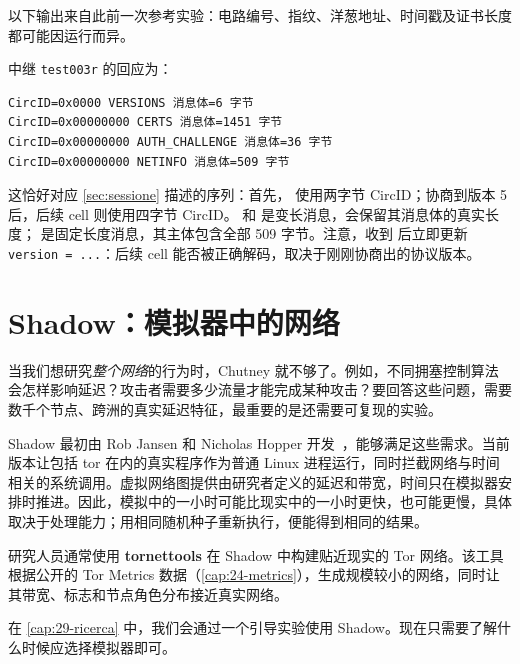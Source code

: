 以下输出来自此前一次参考实验：电路编号、指纹、洋葱地址、时间戳及证书长度都可能因运行而异。

中继 \texttt{test003r} 的回应为：
\begin{lstlisting}[numbers=none]
CircID=0x0000 VERSIONS 消息体=6 字节
CircID=0x00000000 CERTS 消息体=1451 字节
CircID=0x00000000 AUTH_CHALLENGE 消息体=36 字节
CircID=0x00000000 NETINFO 消息体=509 字节
\end{lstlisting}

这恰好对应 \cref{sec:sessione} 描述的序列：首先， 使用两字节 CircID；协商到版本 5 后，后续 cell 则使用四字节 CircID。 和  是变长消息，会保留其消息体的真实长度； 是固定长度消息，其主体包含全部 509 字节。注意，收到  后立即更新 \texttt{version = ...}：后续 cell 能否被正确解码，取决于刚刚协商出的协议版本。

\section{Shadow：模拟器中的网络}\label{sec:rp-shadow}

当我们想研究\emph{整个网络}的行为时，Chutney 就不够了。例如，不同拥塞控制算法会怎样影响延迟？攻击者需要多少流量才能完成某种攻击？要回答这些问题，需要数千个节点、跨洲的真实延迟特征，最重要的是还需要可复现的实验。

Shadow 最初由 Rob Jansen 和 Nicholas Hopper 开发~\cite{jansen2012shadow}，能够满足这些需求。当前版本让包括 tor 在内的真实程序作为普通 Linux 进程运行，同时拦截网络与时间相关的系统调用。虚拟网络图提供由研究者定义的延迟和带宽，时间只在模拟器安排时推进。因此，模拟中的一小时可能比现实中的一小时更快，也可能更慢，具体取决于处理能力；用相同随机种子重新执行，便能得到相同的结果。

研究人员通常使用 \textbf{tornettools} 在 Shadow 中构建贴近现实的 Tor 网络。该工具根据公开的 Tor Metrics 数据（\cref{cap:24-metrics}），生成规模较小的网络，同时让其带宽、标志和节点角色分布接近真实网络。

在 \cref{cap:29-ricerca} 中，我们会通过一个引导实验使用 Shadow。现在只需要了解什么时候应选择模拟器即可。

